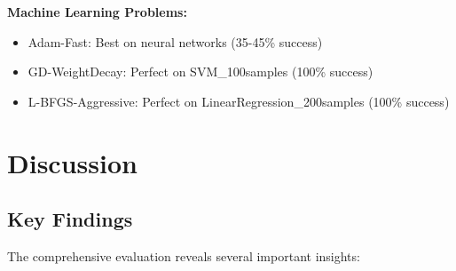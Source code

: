 \textbf{Machine Learning Problems:}

\begin{itemize}
\tightlist
\item
  Adam-Fast: Best on neural networks (35-45\% success)
\item
  GD-WeightDecay: Perfect on SVM\_100samples (100\% success)
\item
  L-BFGS-Aggressive: Perfect on LinearRegression\_200samples (100\% success)
\end{itemize}

\hypertarget{discussion}{%
\section{Discussion}\label{discussion}}

\hypertarget{key-findings}{%
\subsection{Key Findings}\label{key-findings}}

The comprehensive evaluation reveals several important insights:

